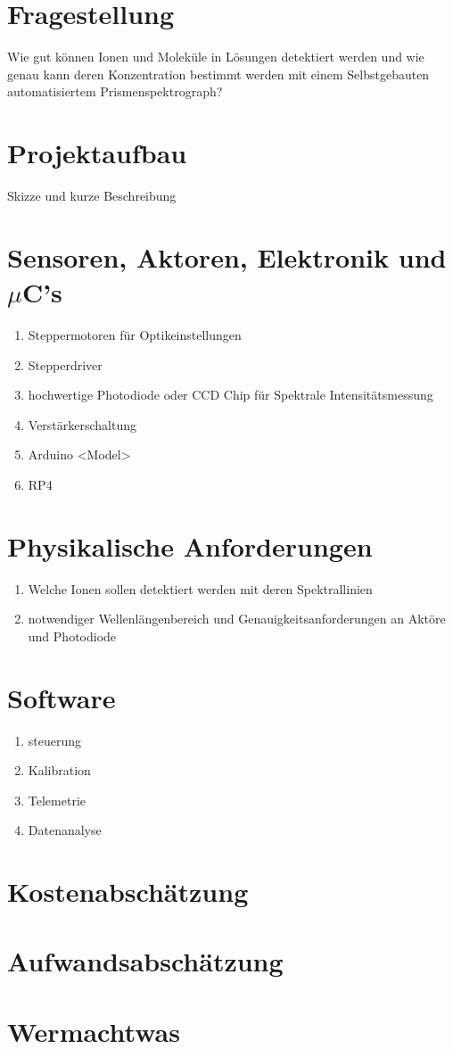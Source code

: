 \section*{Fragestellung}
Wie gut können Ionen und Moleküle in Lösungen detektiert werden und wie genau kann deren Konzentration bestimmt werden mit einem Selbstgebauten automatisiertem Prismenspektrograph?

\section*{Projektaufbau}
Skizze und kurze Beschreibung

\section*{Sensoren, Aktoren, Elektronik und $\mu$C's}
\begin{enumerate}
    \item Steppermotoren für Optikeinstellungen
    \item Stepperdriver
    \item hochwertige Photodiode oder CCD Chip für Spektrale Intensitätsmessung
    \item Verstärkerschaltung
    \item Arduino <Model>
    \item RP4
\end{enumerate}

\section*{Physikalische Anforderungen}
\begin{enumerate}
    \item Welche Ionen sollen detektiert werden mit deren Spektrallinien
    \item notwendiger Wellenlängenbereich und Genauigkeitsanforderungen an Aktöre und Photodiode
\end{enumerate}

\section*{Software}
\begin{enumerate}
    \item steuerung
    \item Kalibration
    \item Telemetrie
    \item Datenanalyse
\end{enumerate}

\section*{Kostenabschätzung}

\section*{Aufwandsabschätzung}

\section*{Wermachtwas}